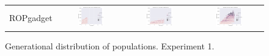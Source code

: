 \documentclass{article}
\begin{document}
\begin{landscape}
\begin{figure}[t]
\begin{center}
\begin{tabular}{c c c c}
    ROPgadget & \includegraphics[align=c,width=0.42\textwidth]{gd/e1/4} & \includegraphics[align=c,width=0.42\textwidth]{gd/e1/5} & \includegraphics[align=c,width=0.42\textwidth]{gd/e1/6} \\
\end{tabular}
\end{center}
\caption{Generational distribution of populations. Experiment 1.}
\label{fig:gd/e1}
\end{figure}


\end{landscape}
\end{document}
